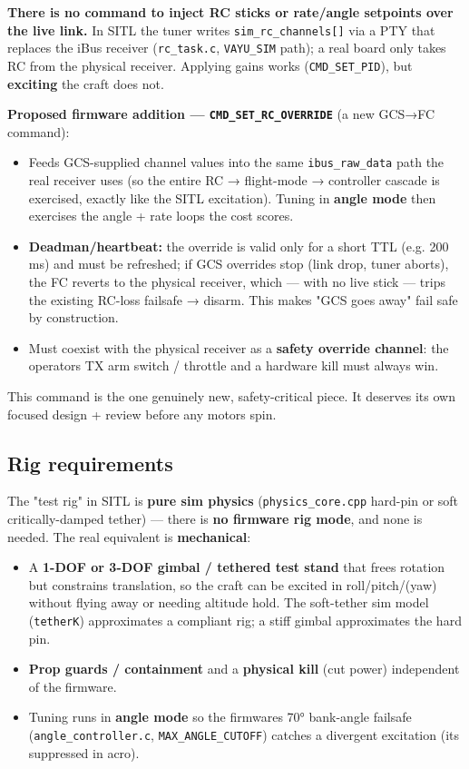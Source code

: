 \documentclass[
  11pt,
]{article}
\providecommand{\tightlist}{%
  \setlength{\itemsep}{0pt}\setlength{\parskip}{0pt}}
\begin{document}
\textbf{There is no command to inject RC sticks or rate/angle setpoints
over the live link.} In SITL the tuner writes
\texttt{sim\_rc\_channels{[}{]}} via a PTY that replaces the iBus
receiver (\texttt{rc\_task.c}, \texttt{VAYU\_SIM} path); a real board
only takes RC from the physical receiver. Applying gains works
(\texttt{CMD\_SET\_PID}), but \textbf{exciting} the craft does not.

\textbf{Proposed firmware addition --- \texttt{CMD\_SET\_RC\_OVERRIDE}}
(a new GCS→FC command):

\begin{itemize}
\tightlist
\item
  Feeds GCS-supplied channel values into the same
  \texttt{ibus\_raw\_data} path the real receiver uses (so the entire RC
  → flight-mode → controller cascade is exercised, exactly like the SITL
  excitation). Tuning in \textbf{angle mode} then exercises the angle +
  rate loops the cost scores.
\item
  \textbf{Deadman/heartbeat:} the override is valid only for a short TTL
  (e.g. 200 ms) and must be refreshed; if GCS overrides stop (link drop,
  tuner aborts), the FC reverts to the physical receiver, which --- with
  no live stick --- trips the existing RC-loss failsafe → disarm. This
  makes "GCS goes away" fail safe by construction.
\item
  Must coexist with the physical receiver as a \textbf{safety override
  channel}: the operator\textquotesingle s TX arm switch / throttle and
  a hardware kill must always win.
\end{itemize}

This command is the one genuinely new, safety-critical piece. It
deserves its own focused design + review before any motors spin.

\hypertarget{rig-requirements}{%
\subsection{Rig requirements}\label{rig-requirements}}

The "test rig" in SITL is \textbf{pure sim physics}
(\texttt{physics\_core.cpp} hard-pin or soft critically-damped tether)
--- there is \textbf{no firmware rig mode}, and none is needed. The real
equivalent is \textbf{mechanical}:

\begin{itemize}
\tightlist
\item
  A \textbf{1-DOF or 3-DOF gimbal / tethered test stand} that frees
  rotation but constrains translation, so the craft can be excited in
  roll/pitch/(yaw) without flying away or needing altitude hold. The
  soft-tether sim model (\texttt{tetherK}) approximates a compliant rig;
  a stiff gimbal approximates the hard pin.
\item
  \textbf{Prop guards / containment} and a \textbf{physical kill} (cut
  power) independent of the firmware.
\item
  Tuning runs in \textbf{angle mode} so the firmware\textquotesingle s
  70° bank-angle failsafe (\texttt{angle\_controller.c},
  \texttt{MAX\_ANGLE\_CUTOFF}) catches a divergent excitation
  (it\textquotesingle s suppressed in acro).
\end{itemize}
\end{document}
